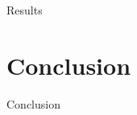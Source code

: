 \documentclass[12pt]{article}
\begin{document}
\par{Results}

\section*{Conclusion}

\par{Conclusion}






\end{document}
